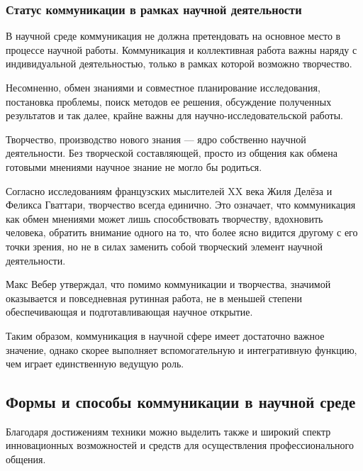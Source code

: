 \subsubsection{Статус коммуникации в рамках научной деятельности}

В научной среде коммуникация не должна претендовать на основное место в процессе научной работы. Коммуникация и коллективная работа важны наряду с индивидуальной
деятельностью, только в рамках которой возможно творчество. 

Несомненно, обмен
знаниями и совместное планирование исследования, постановка проблемы, поиск
методов ее решения, обсуждение полученных результатов и так далее, крайне важны
для научно-исследовательской работы.

Творчество, производство нового знания — ядро собственно научной деятельности.
Без творческой составляющей, просто из общения как обмена готовыми мнениями научное знание не
могло бы родиться. 

Согласно исследованиям французских мыслителей
XX века Жиля Делёза и Феликса Гваттари, творчество всегда единично. Это означает, что
коммуникация как обмен мнениями может лишь способствовать творчеству, вдохновить
человека, обратить внимание одного на то, что более ясно видится другому с его
точки зрения, но не в силах заменить собой творческий элемент научной
деятельности. 

Макс Вебер утверждал, что помимо коммуникации и творчества,
значимой оказывается и повседневная рутинная работа, не в меньшей
степени обеспечивающая и подготавливающая научное открытие.

Таким образом, коммуникация в научной сфере имеет
достаточно важное значение, однако скорее выполняет вспомогательную и
интегративную функцию, чем играет единственную ведущую роль.


\subsection{Формы и способы коммуникации в научной среде}

Благодаря достижениям техники можно
выделить также и широкий спектр инновационных
возможностей и средств для осуществления профессионального общения.

